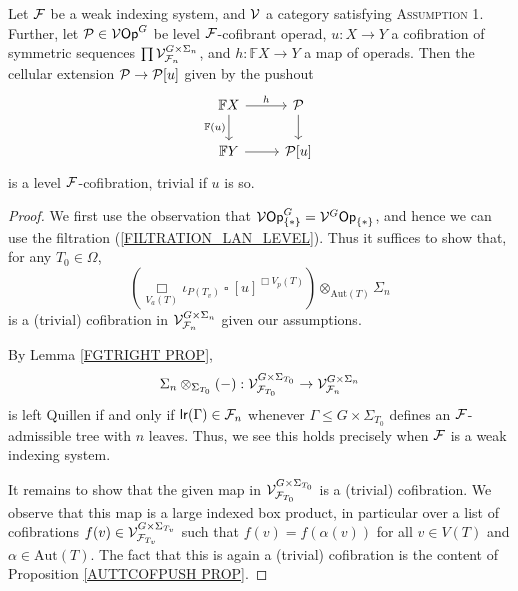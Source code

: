 \documentclass[a4paper,10pt]{article}%
\begin{document}
\begin{proposition}
  \label{CELLULAR_EXTENSION_COFIBRATION_THEOREM}
  Let $\F$ be a weak indexing system, and $\V$ a category satisfying \textsc{Assumption 1}. Further, let $\P\in \V\Op^G$ be level $\F$-cofibrant operad, $u: X \to Y$ a cofibration of symmetric sequences $\prod\V_{\F_n}^{G\times \Sigma_n}$, and $h: \mathbb F X \to Y$ a map of operads. Then the cellular extension $\P \to \P[u]$ given by the pushout
\[
\begin{tikzcd}
  \mathbb F X \arrow[d, "\mathbb F(u)"'] \arrow[r, "h"] & \P \arrow[d] \\
  \mathbb F Y \arrow[r] & \P[u]
\end{tikzcd}
\]
is a level $\F$-cofibration, trivial if $u$ is so. 
\end{proposition}
\begin{proof}
  We first use the observation that $\V\Op^G_{\set *} = \V^G\Op_{\set *}$, and hence we can use the filtration (\ref{FILTRATION_LAN_LEVEL}). Thus it suffices to show that, for any $T_0 \in \Omega$,
\[
\left(\mathop{\Box}\limits_{V_a(T)}\iota_{P(T_v)}\ \square\ [u]^{\Box V_p(T)} \right) \otimes_{\mathrm{Aut}(T)}\Sigma_n
\]
is a (trivial) cofibration in $\V^{G\times \Sigma_n}_{\F_n}$ given our assumptions. 

By Lemma \ref{FGTRIGHT PROP}, 
\[
\Sigma_n \otimes_{\Sigma_{T_0}}(-): \V^{G \times \Sigma_{T_0}}_{\F_{T_0}} \to \V_{\F_n}^{G \times \Sigma_n}
\]
is left Quillen if and only if $\mathsf{lr}(\Gamma) \in \F_n$ whenever $\Gamma \leq G \times \Sigma_{T_0}$ defines an $\F$-admissible tree with $n$ leaves. Thus, we see this holds precisely when $\F$ is a weak indexing system. 

It remains to show that the given map in $\V^{G\times \Sigma_{T_0}}_{\F_{T_0}}$ is a (trivial) cofibration. We observe that this map is a large indexed box product, in particular over a list of cofibrations $f(v) \in \V^{G \times \Sigma_{T_v}}_{\F_{T_v}}$ such that $f(v) = f(\alpha(v))$ for all $v\in V(T)$ and $\alpha \in \mathrm{Aut}(T)$. The fact that this is again a (trivial) cofibration is the content of Proposition \ref{AUTTCOFPUSH PROP}.
\end{proof}
\end{document}
